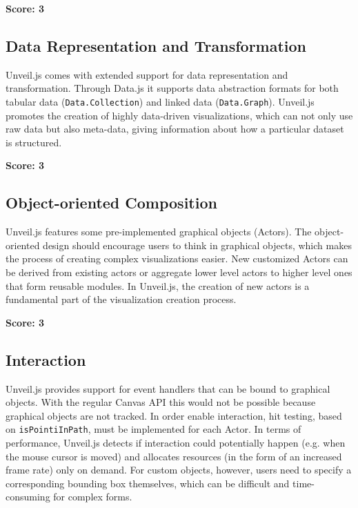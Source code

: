 \SuperPar \textbf{Score: 3}

\subsection{Data Representation and Transformation}

Unveil.js comes with extended support for data representation and transformation. Through Data.js it supports data abstraction formats for both tabular data (\texttt{Data.Collection}) and linked data (\texttt{Data.Graph}). Unveil.js promotes the creation of highly data-driven visualizations, which can not only use raw data but also meta-data, giving information about how a particular dataset is structured.

\SuperPar \textbf{Score: 3}

\subsection{Object-oriented Composition}

Unveil.js features some pre-implemented graphical objects (Actors). The object-oriented design should encourage users to think in graphical objects, which makes the process of creating complex visualizations easier. New customized Actors can be derived from existing actors or aggregate lower level actors to higher level ones that form reusable modules. In Unveil.js, the creation of new actors is a fundamental part of the visualization creation process.

\SuperPar \textbf{Score: 3}

\subsection{Interaction}

Unveil.js provides support for event handlers that can be bound to graphical objects. With the regular Canvas API this would not be possible because graphical objects are not tracked. In order enable interaction, hit testing, based on \texttt{isPointiInPath}, must be implemented for each Actor. In terms of performance, Unveil.js detects if interaction could potentially happen (e.g. when the mouse cursor is moved) and allocates resources (in the form of an increased frame rate) only on demand. For custom objects, however, users need to specify a corresponding bounding box themselves, which can be difficult and time-consuming for complex forms.

